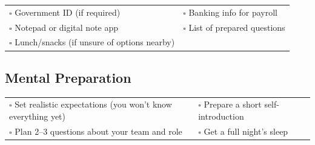 \begin{tabular}{p{9cm} p{8cm}}
$\square$ Government ID (if required) & $\square$ Banking info for payroll \\ 
$\square$ Notepad or digital note app & $\square$ List of prepared questions \\ 
$\square$ Lunch/snacks (if unsure of options nearby) & \\ 
\end{tabular}

\subsection{Mental Preparation}

\begin{tabular}{p{9cm} p{8cm}}
$\square$ Set realistic expectations (you won’t know everything yet) & $\square$ Prepare a short self-introduction \\ 
$\square$ Plan 2–3 questions about your team and role & $\square$ Get a full night’s sleep \\ 
\end{tabular}

